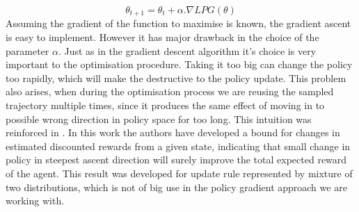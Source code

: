 \documentclass{article}
\begin{document}
$$\theta_{t+1} = \theta_{t} + \alpha .\nabla LPG(\theta)$$
Assuming the gradient of the function to maximise is known, the gradient ascent is easy to implement. However it has major drawback in the choice of the parameter $\alpha$. Just as in the gradient descent algorithm it's choice is very important to the optimisation procedure. Taking it too big can change the policy too rapidly, which will make the destructive to the policy update. This problem also arises, when during the optimisation process we are reusing the sampled trajectory multiple times, since it produces the same effect of moving in to possible wrong direction in policy space for too long. This intuition was reinforced in \cite{Kakade2002ApproximatelyOA}. In this work the authors have developed a bound for changes in estimated discounted rewards from a given state, indicating that small change in policy in steepest ascent direction will surely improve the total expected reward of the agent. This result was developed for update rule represented by mixture of two distributions, which is not of big use in the policy gradient approach we are working with. 



\end{document}
